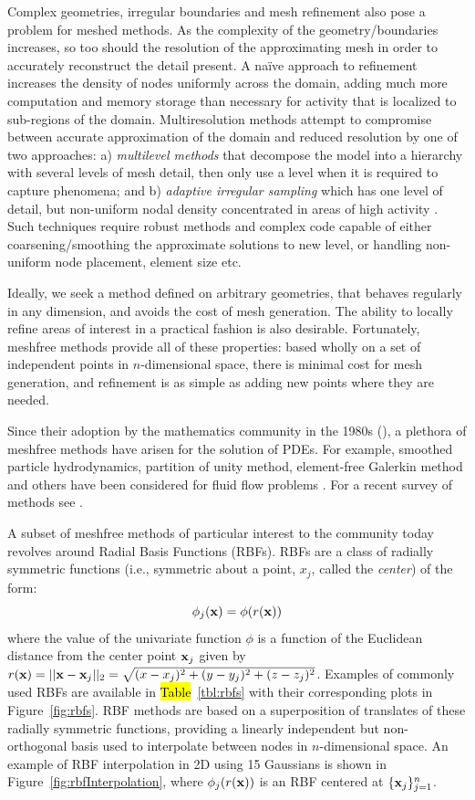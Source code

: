 \documentclass[11pt]{report}
\begin{document}
Complex geometries, irregular boundaries and mesh refinement also pose a problem for meshed methods. As the complexity of 
the geometry/boundaries increases, so too should the resolution of the approximating mesh in order to 
accurately reconstruct the detail present. A na\"{i}ve approach to refinement increases the density of nodes uniformly across the 
domain, adding much more computation and memory storage than necessary for activity that is localized to sub-regions 
of the domain. Multiresolution methods attempt to compromise between accurate approximation of the domain and 
reduced resolution by one of two approaches: a) \emph{multilevel methods} that decompose the model into a hierarchy with 
several levels of mesh detail, then only use a level when it is required to capture phenomena; and b) \emph{adaptive irregular 
sampling} which has one level of detail, but non-uniform nodal density concentrated in areas of high activity \cite
{Iske2004}. Such techniques require robust methods and complex code capable of either coarsening/smoothing the 
approximate solutions to new level, or handling non-uniform node placement, element size etc. 

Ideally, we seek a method defined on arbitrary geometries, that behaves regularly in any dimension, and avoids the cost of 
mesh generation. The ability to locally refine areas of interest in a practical fashion is also desirable. Fortunately, meshfree 
methods provide all of these properties: based wholly on a set of independent points in $n$-dimensional space, 
there is minimal cost for mesh generation, and refinement is as simple as adding new points where 
they are needed. 

Since their adoption by the mathematics community in the 1980s (\cite{Fasshauer2007}), a plethora of meshfree methods have 
arisen for the solution of PDEs. For example, smoothed particle hydrodynamics, partition of unity method, element-free Galerkin 
method and others have been considered for fluid flow problems \cite{Chandhini2007}. For a recent survey of methods see \cite{Li2007}.


A subset of meshfree methods of particular interest to the
community today revolves around Radial Basis Functions (RBFs).
RBFs are a class of radially symmetric functions (i.e.,
symmetric about a point, $x_j$, called the \emph{center}) of the
form: 
	\begin{equation} 
		\phi_j(\mathbf{x}) = \phi(r(\mathbf{x}))
	\end{equation} 
where the value of the univariate function $\phi$ is a
function of the Euclidean distance from the center point $\mathbf{x}_j$ given by
$r(\mathbf{x}) = ||\mathbf{x}-\mathbf{x}_j||_2 = \sqrt{(x-x_j)^2 + (y-y_j)^2 + (z-z_j)^2}$. Examples of
commonly used RBFs are available in \hl{Table}~\ref{tbl:rbfs}
with their corresponding plots in Figure~\ref{fig:rbfs}. RBF
methods are based on a superposition of translates of these
radially symmetric functions, providing a linearly independent
but non-orthogonal basis used to interpolate between nodes in
$n$-dimensional space. An example of RBF interpolation in 2D
using 15 Gaussians is shown in
Figure~\ref{fig:rbfInterpolation}, where $\phi_j(r(\mathbf{x}))$ is an
RBF centered at $\{\mathbf{x}_j\}_{j=1}^{n}$.
\end{document}
